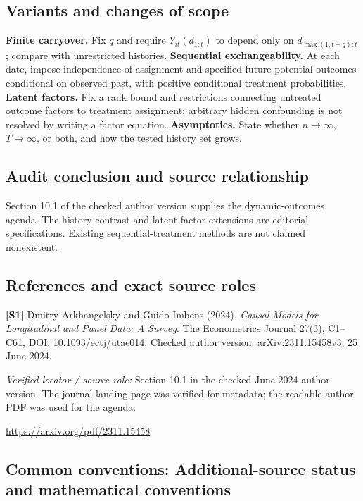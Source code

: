 \documentclass[11pt,a4paper]{article}
\begin{document}
\subsection*{Variants and changes of scope}

\textbf{Finite carryover.} Fix $q$ and require $Y_{it}(d_{1:t})$ to depend only on $d_{\max(1,t-q):t}$; compare with unrestricted histories. \textbf{Sequential exchangeability.} At each date, impose independence of assignment and specified future potential outcomes conditional on observed past, with positive conditional treatment probabilities. \textbf{Latent factors.} Fix a rank bound and restrictions connecting untreated outcome factors to treatment assignment; arbitrary hidden confounding is not resolved by writing a factor equation. \textbf{Asymptotics.} State whether $n\to\infty$, $T\to\infty$, or both, and how the tested history set grows.

\subsection*{Audit conclusion and source relationship}

Section 10.1 of the checked author version supplies the dynamic-outcomes agenda. The history contrast and latent-factor extensions are editorial specifications. Existing sequential-treatment methods are not claimed nonexistent.

\subsection*{References and exact source roles}

{\footnotesize\raggedright
\par\noindent\textbf{[S1]} Dmitry Arkhangelsky and Guido Imbens (2024). \emph{Causal Models for Longitudinal and Panel Data: A Survey}. The Econometrics Journal 27(3), C1--C61, DOI: 10.1093/ectj/utae014. Checked author version: arXiv:2311.15458v3, 25 June 2024.\par \textit{Verified locator / source role:} Section 10.1 in the checked June 2024 author version. The journal landing page was verified for metadata; the readable author PDF was used for the agenda.\par \url{https://arxiv.org/pdf/2311.15458}\par\smallskip
}

\subsection*{Common conventions: Additional-source status and mathematical conventions}
\end{document}
